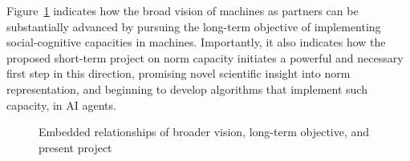 Figure~\ref{fig:visionobjective} indicates how the broad vision of
machines as partners can be substantially advanced by pursuing the
long-term objective of implementing social-cognitive capacities in
machines.  Importantly, it also indicates how the proposed short-term
project on norm capacity initiates a powerful and necessary first step
in this direction, promising novel scientific insight into norm
representation, and beginning to develop algorithms that implement
such capacity, in AI agents.

\begin{figure}[h!]
\centering
\caption{\small Embedded relationships of broader vision, long-term objective, and present project}
\label{fig:visionobjective}
\end{figure}

